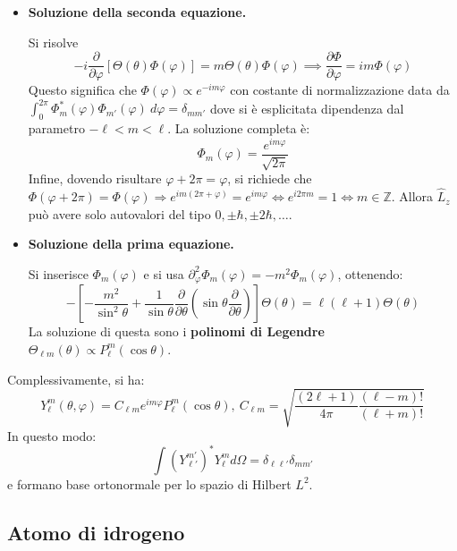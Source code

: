 \documentclass[11pt, a4paper]{scrartcl} %
\numberwithin{equation}{subsection}
\theoremstyle{style2}
\theoremstyle{style1}
\begin{document}
\begin{itemize}
	\item \textbf{Soluzione della seconda equazione.} 

		Si risolve 
		\[
		-i \frac{\partial }{\partial \varphi } \left[ \Theta(\theta ) \Phi(\varphi ) \right] = m \Theta(\theta ) \Phi(\varphi ) \implies \frac{\partial \Phi}{\partial \varphi } = im \Phi (\varphi )
		\] 
		Questo significa che $\Phi(\varphi ) \propto e^{-im\varphi } $ con costante di normalizzazione data da $\int_{0} ^{2\pi} \Phi_m^*(\varphi ) \Phi_{m'} (\varphi ) \ d\varphi = \delta _{m m '} $ dove si \`e esplicitata dipendenza dal parametro $-\ell <m <\ell $. La soluzione completa \`e:
		\begin{equation}
			\Phi_m(\varphi ) = \frac{e^{im\varphi } }{\sqrt{2\pi} }
		\end{equation}
		Infine, dovendo risultare $\varphi  +2\pi = \varphi $, si richiede che $\Phi (\varphi + 2\pi ) = \Phi(\varphi ) \Rightarrow e^{im (2\pi + \varphi ) } = e^{im\varphi } \iff e^{i 2\pi m} = 1 \iff m \in \mathbb{Z}$. Allora $\hat{L}_z$ pu\`o avere solo autovalori del tipo $0, \pm\hbar , \pm 2 \hbar , \ldots$.
	\item \textbf{Soluzione della prima equazione.} 

		Si inserisce $\Phi_m(\varphi )$ e si usa $\partial^2_\varphi  \Phi_m(\varphi ) =-m^2 \Phi_m(\varphi) $, ottenendo:
		\[
		- \left[ - \frac{m^2}{\sin^ 2 \theta } + \frac{1}{\sin\theta } \frac{\partial }{\partial \theta } \left(\sin \theta \frac{\partial }{\partial \theta } \right)  \right] \Theta(\theta ) = \ell (\ell +1) \Theta(\theta )
		\] 
		La soluzione di questa sono i \textbf{polinomi di Legendre} $\Theta_{\ell m} (\theta ) \propto P^m_\ell (\cos \theta ) $.
\end{itemize}
Complessivamente, si ha:
\begin{equation}
	Y^m_\ell (\theta ,\varphi ) = C_{\ell m}  e^{im \varphi } P^m_\ell (\cos \theta ), \ C_{\ell m} = \sqrt{\frac{(2\ell +1)}{4\pi} \frac{(\ell -m)!}{(\ell +m)!}} 
\end{equation}
In questo modo:
\[
\int (Y^{m'} _{\ell '} )^* Y^m_\ell  d \Omega  = \delta _{\ell \ell '} \delta _{m m'} 
\] 
e formano base ortonormale per lo spazio di Hilbert $L^2$.

\subsection{Atomo di idrogeno}
\end{document}
